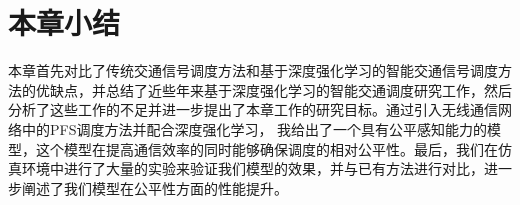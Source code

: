\section{本章小结}
本章首先对比了传统交通信号调度方法和基于深度强化学习的智能交通信号调度方法的优缺点，并总结了近些年来基于深度强化学习的智能交通调度研究工作，然后分析了这些工作的不足并进一步提出了本章工作的研究目标。通过引入无线通信网络中的PFS调度方法并配合深度强化学习，
我给出了一个具有公平感知能力的模型，这个模型在提高通信效率的同时能够确保调度的相对公平性。最后，我们在仿真环境中进行了大量的实验来验证我们模型的效果，并与已有方法进行对比，进一步阐述了我们模型在公平性方面的性能提升。